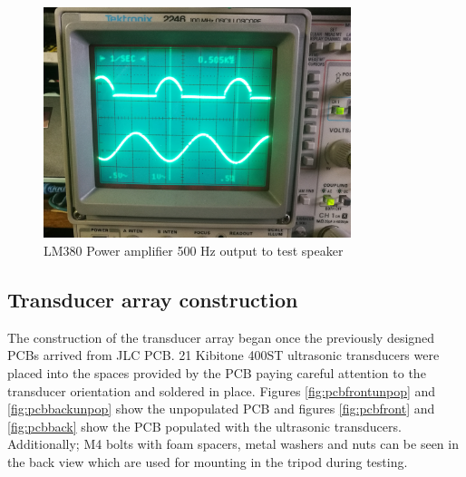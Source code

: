 \begin{figure}[ht!]
    \centering
    \includegraphics[width=0.8\textwidth]{Figures/Implementation/Amplifier/ampOutbb.jpg}
    \caption{LM380 Power amplifier 500 Hz output to test speaker}
    \label{fig:ampOscOut}
\end{figure}


\newpage
\subsection{Transducer array construction}
The construction of the transducer array began once the previously designed PCBs arrived from JLC PCB. 21 Kibitone 400ST ultrasonic transducers were placed into the spaces provided by the PCB paying careful attention to the transducer orientation and soldered in place. Figures \ref{fig:pcbfrontunpop} and \ref{fig:pcbbackunpop} show the unpopulated PCB and figures \ref{fig:pcbfront} and \ref{fig:pcbback} show the PCB populated with the ultrasonic transducers. Additionally; M4 bolts with foam spacers, metal washers and nuts can be seen in the back view which are used for mounting in the tripod during testing.

